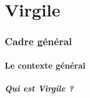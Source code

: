 \documentclass[a4paper, 11pt, hidelinks]{article}
\begin{document}
\part{Virgile}


\section{Cadre général}

\subsection{Le contexte général}


\subsubsection{Qui est Virgile ?}
\end{document}
